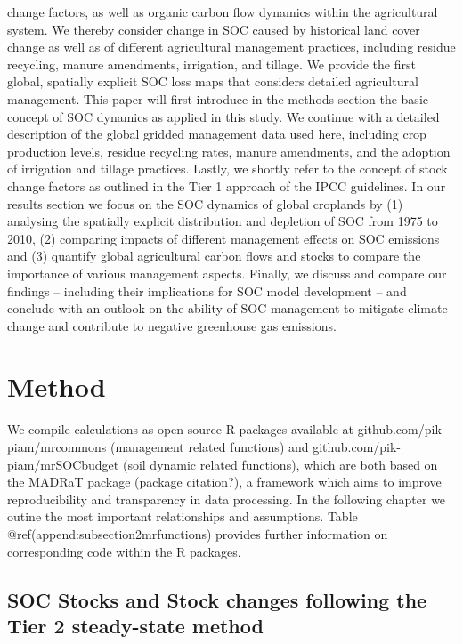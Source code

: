 \documentclass[gc, manuscript]{copernicus}
\begin{document}
change factors, as well as organic carbon flow dynamics within the
agricultural system. We thereby consider change in SOC caused by
historical land cover change as well as of different agricultural
management practices, including residue recycling, manure amendments,
irrigation, and tillage. We provide the first global, spatially explicit
SOC loss maps that considers detailed agricultural management. This
paper will first introduce in the methods section the basic concept of
SOC dynamics as applied in this study. We continue with a detailed
description of the global gridded management data used here, including
crop production levels, residue recycling rates, manure amendments, and
the adoption of irrigation and tillage practices. Lastly, we shortly
refer to the concept of stock change factors as outlined in the Tier 1
approach of the IPCC guidelines. In our results section we focus on the
SOC dynamics of global croplands by (1) analysing the spatially explicit
distribution and depletion of SOC from 1975 to 2010, (2) comparing
impacts of different management effects on SOC emissions and (3)
quantify global agricultural carbon flows and stocks to compare the
importance of various management aspects. Finally, we discuss and
compare our findings -- including their implications for SOC model
development -- and conclude with an outlook on the ability of SOC
management to mitigate climate change and contribute to negative
greenhouse gas emissions. \newpage

\section{Method}

We compile calculations as open-source R packages available at
github.com/pik-piam/mrcommons (management related functions) and
github.com/pik-piam/mrSOCbudget (soil dynamic related functions), which
are both based on the MADRaT package (package citation?), a framework
which aims to improve reproducibility and transparency in data
processing. In the following chapter we outine the most important
relationships and assumptions. Table @ref(append:subsection2mrfunctions)
provides further information on corresponding code within the R
packages.

\hypertarget{sec:carbonbudget}{%
\subsection{SOC Stocks and Stock changes following the Tier 2
steady-state method}\label{sec:carbonbudget}}
\end{document}
